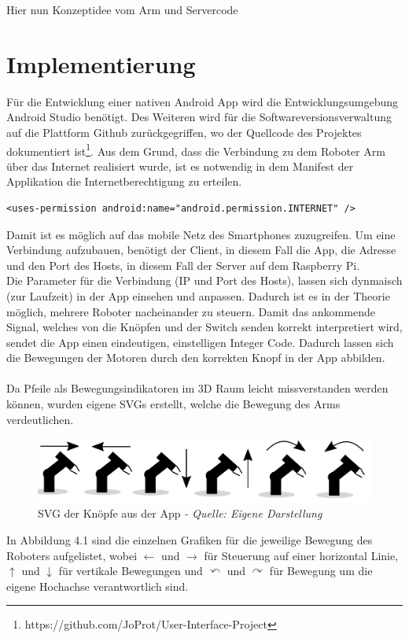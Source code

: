 \documentclass[12pt,					%
							 oneside,			%
							 a4paper,			%
							 halfparskip,		%
							 liststotoc,			%
							 bibtotoc,			%
							 fleqn,				%
							 pointlessnumbers]	%
							 {scrreprt}
\begin{document}
Hier nun Konzeptidee vom Arm und Servercode

\chapter{Implementierung}	
Für die Entwicklung einer nativen Android App wird die Entwicklungsumgebung Android Studio benötigt. Des Weiteren wird für die Softwareversionsverwaltung auf die Plattform Github zurückgegriffen, wo der Quellcode des Projektes dokumentiert ist\footnote{https://github.com/JoProt/User-Interface-Project}. Aus dem Grund, dass die Verbindung zu dem Roboter Arm über das Internet realisiert wurde, ist es notwendig in dem Manifest der Applikation die Internetberechtigung zu erteilen. \\
\begin{lstlisting}
<uses-permission android:name="android.permission.INTERNET" />
\end{lstlisting}

Damit ist es möglich auf das mobile Netz des Smartphones zuzugreifen. Um eine Verbindung aufzubauen, benötigt der Client, in diesem Fall die App, die Adresse und den Port des Hosts, in diesem Fall der Server auf dem Raspberry Pi. \\
Die Parameter für die Verbindung (IP und Port des Hosts), lassen sich dynmaisch (zur Laufzeit) in der App einsehen und anpassen. Dadurch ist es in der Theorie möglich, mehrere Roboter nacheinander zu steuern. 
Damit das ankommende Signal, welches von die Knöpfen und der Switch senden korrekt interpretiert wird, sendet die App einen eindeutigen, einstelligen Integer Code. Dadurch lassen sich die Bewegungen der Motoren durch den korrekten Knopf in der App abbilden. \\ \\
Da Pfeile als Bewegungsindikatoren im 3D Raum leicht missverstanden werden können, wurden eigene SVGs erstellt, welche die Bewegung des Arms verdeutlichen. \\
\begin{figure}[h]
	\centering
	\includegraphics[scale=0.3]{pictures/robissvg.jpg}
	\caption{SVG der Knöpfe aus der App \textit{- Quelle: Eigene Darstellung}}
\end{figure}
\newpage
In Abbildung 4.1 sind die einzelnen Grafiken für die jeweilige Bewegung des Roboters aufgelistet, wobei $\leftarrow$ und $\rightarrow$ für Steuerung auf einer horizontal Linie, $\uparrow$ und $\downarrow$ für vertikale Bewegungen und $\curvearrowleft$ und $\curvearrowright$ für Bewegung um die eigene Hochachse verantwortlich sind.
\end{document}
